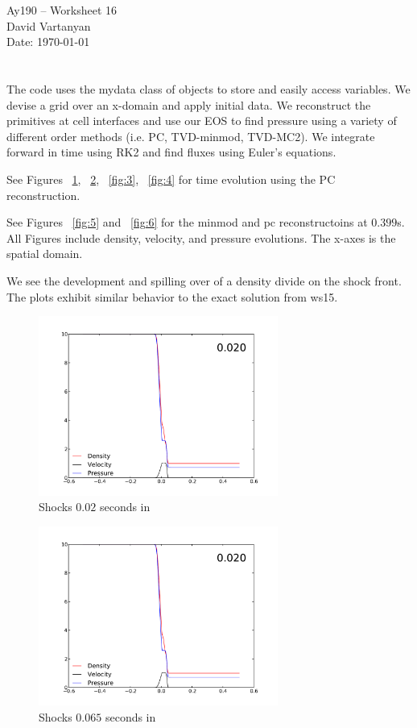 \documentclass[11pt,letterpaper]{article}
\begin{document}
\begin{center}
\Large
Ay190 -- Worksheet 16\\
David Vartanyan\\
Date: \today
\end{center}

\section{}

The code uses the mydata class of objects to store and easily access variables.
We devise a grid over an x-domain and apply initial data. We reconstruct the primitives at cell interfaces and use our EOS to find pressure using a variety of different order methods (i.e. PC, TVD-minmod, TVD-MC2). We integrate forward in time using RK2 and find fluxes using Euler's equations.

See Figures ~\ref{fig:1}, ~\ref{fig:2}, ~\ref{fig:3}, ~\ref{fig:4} for time evolution using the PC reconstruction.

See Figures ~\ref{fig:5} and ~\ref{fig:6} for the minmod and pc reconstructoins at $0.399$s. All Figures include density, velocity, and pressure evolutions. The x-axes is the spatial domain.

We see the development and spilling over of a density divide on the shock front.
The plots exhibit similar behavior to the exact solution from ws15.

\begin{figure}[bth]
\centering
\includegraphics[width=0.7\textwidth]{t100.pdf}
\caption{Shocks $0.02$ seconds in}
\label{fig:1}
\end{figure}

\begin{figure}[bth]
\centering
\includegraphics[width=0.7\textwidth]{t100.pdf}
\caption{Shocks $0.065$ seconds in}
\label{fig:2}
\end{figure}
\end{document}
